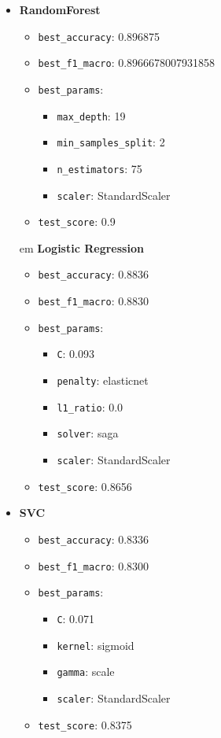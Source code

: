 \documentclass[10pt]{IEEEtran}
\begin{document}
\begin{itemize}
  \item \textbf{RandomForest}
  \begin{itemize}
    \item \texttt{best\_accuracy}: 0.896875
    \item \texttt{best\_f1\_macro}: 0.8966678007931858
    \item \texttt{best\_params}:
    \begin{itemize}
      \item \texttt{max\_depth}: 19
      \item \texttt{min\_samples\_split}: 2
      \item \texttt{n\_estimators}: 75
      \item \texttt{scaler}: StandardScaler
    \end{itemize}
    \item \texttt{test\_score}: 0.9
  \end{itemize}em \textbf{Logistic Regression}
    \begin{itemize}
        \item \texttt{best\_accuracy}: 0.8836
        \item \texttt{best\_f1\_macro}: 0.8830
        \item \texttt{best\_params}:
        \begin{itemize}
            \item \texttt{C}: 0.093
            \item \texttt{penalty}: elasticnet
            \item \texttt{l1\_ratio}: 0.0
            \item \texttt{solver}: saga
            \item \texttt{scaler}: StandardScaler
        \end{itemize}
        \item \texttt{test\_score}: 0.8656
    \end{itemize}
    \item \textbf{SVC}
    \begin{itemize}
        \item \texttt{best\_accuracy}: 0.8336
        \item \texttt{best\_f1\_macro}: 0.8300
        \item \texttt{best\_params}:
        \begin{itemize}
            \item \texttt{C}: 0.071
            \item \texttt{kernel}: sigmoid
            \item \texttt{gamma}: scale
            \item \texttt{scaler}: StandardScaler
        \end{itemize}
        \item \texttt{test\_score}: 0.8375
    \end{itemize}


\end{itemize}
\end{document}
